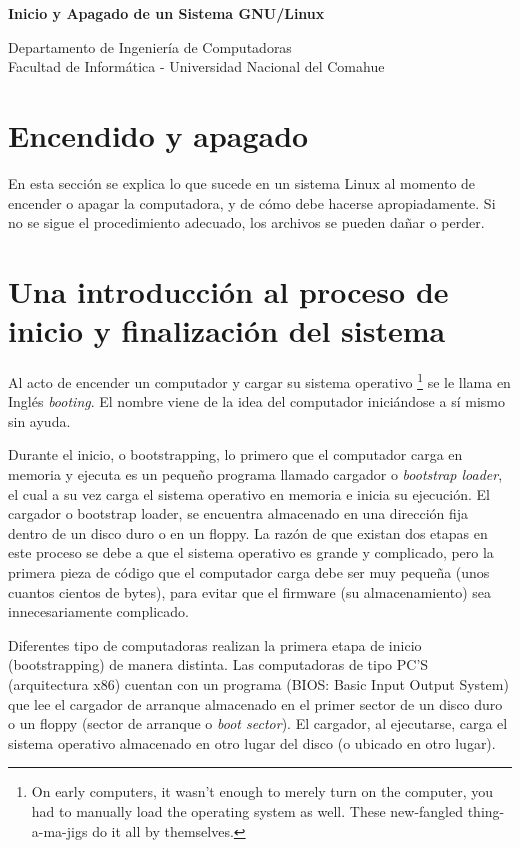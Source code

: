 \documentclass[12pt]{article}
\def\maketitle{

 \makeatletter
 {\color{bl} \centering \huge \sc \textbf{
Inicio y Apagado de un Sistema GNU/Linux \\ 
 \vspace*{8pt} }\par}
 \makeatother


 \makeatletter
 {\centering \small 
 	Departamento de Ingeniería de Computadoras \\
 	Facultad de Informática - Universidad Nacional del Comahue \\
 	\vspace{20pt} }
 \makeatother

}
\begin{document}
\thispagestyle{empty}
\maketitle
\setlength{\parindent}{0pt}



\section{Encendido y apagado}


 En esta sección se explica lo que sucede en un sistema Linux al momento
de encender o apagar la computadora, y de cómo debe hacerse apropiadamente. Si
no se sigue el procedimiento adecuado, los archivos se pueden dañar o perder.


\section{ Una introducción al proceso de inicio y finalización del
sistema}

Al acto de encender un computador y cargar su sistema operativo 
		\footnote{On early computers, it wasn't enough to merely
		turn on the computer, you had to manually load the operating
		system as well.  These new-fangled thing-a-ma-jigs do it all by
		themselves.} 
se le llama en Inglés \textit{booting}. El nombre viene de
la idea del computador iniciándose a sí mismo sin ayuda.  

Durante el inicio, o bootstrapping, lo primero que el computador carga en
memoria y ejecuta es un pequeño programa llamado cargador o \textit{bootstrap
loader}, el cual a su vez carga el sistema operativo en memoria e
inicia su ejecución. El cargador o bootstrap loader, se encuentra almacenado en
una dirección fija dentro de un disco duro o en un floppy. La razón de que
existan dos etapas en este proceso se debe a que el sistema operativo es grande
y complicado, pero la primera pieza de código que el computador carga debe ser
muy pequeña (unos cuantos cientos de bytes), para evitar que el firmware (su
almacenamiento) sea innecesariamente complicado.  

 Diferentes tipo de computadoras realizan la primera etapa de inicio
(bootstrapping) de manera distinta. Las computadoras de tipo PC'S (arquitectura
x86) cuentan con un programa (BIOS: Basic Input Output System) que lee el
cargador de arranque almacenado en el primer sector de un disco duro o un floppy
(sector de arranque o \textit{boot sector}). El cargador, al
ejecutarse, carga el sistema operativo almacenado en otro lugar del disco (o
ubicado en otro lugar).  
\end{document}
